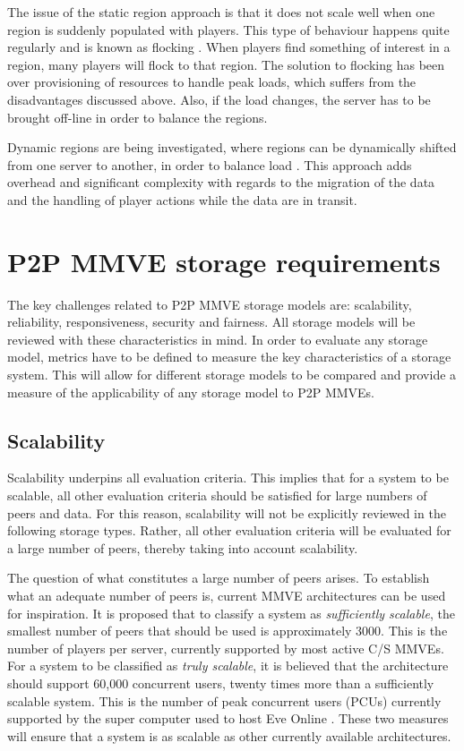 The issue of the static region approach is that it does not scale well when one region is suddenly populated with players. This type of behaviour
happens quite regularly and is known as flocking \cite{flocking}. When players find something of interest in a region, many players will flock to
that region. The solution to flocking has been over provisioning of resources to handle peak loads, which suffers from the disadvantages discussed above. Also, if the load changes, the server has to be brought off-line in order to balance the regions.

Dynamic regions are being investigated, where regions can be dynamically shifted from one server to another, in order to balance load
\cite{zone_based_dyn}. This approach adds overhead and significant complexity with regards to the migration of the data and the handling of player actions while the data are in transit.

\section{P2P MMVE storage requirements}
\label{key_challenges_cm}

The key challenges related to P2P MMVE storage models are: scalability, reliability, responsiveness, security and fairness. All storage models will be reviewed with these characteristics in mind. In order to evaluate any storage model, metrics have to be defined to measure the key characteristics of a storage system. This will allow for different storage models to be compared and provide a measure of the applicability of any storage model to P2P MMVEs.

\subsection{Scalability}
\label{scalability_req}
Scalability underpins all evaluation criteria. This implies that for a system to be scalable, all other evaluation criteria should be satisfied for large numbers of peers and data. For this reason, scalability will not be explicitly reviewed in the following storage types. Rather, all other evaluation criteria will be evaluated for a large number of peers, thereby taking into account scalability.

The question of what constitutes a large number of peers arises. To establish what an adequate number of peers is, current MMVE architectures can be used for inspiration. It is proposed that to classify a system as \emph{sufficiently scalable}, the smallest number of peers that should be used is approximately 3000. This is the number of players per server, currently supported by most active C/S MMVEs. For a system to be classified as \emph{truly scalable}, it is believed that the architecture should support 60,000 concurrent users, twenty times more than a sufficiently scalable
system. This is the number of peak concurrent users (PCUs) currently supported by the super computer used to host Eve Online \cite{eve_pcu}. These two measures will ensure that a system is as scalable as other currently available architectures.


